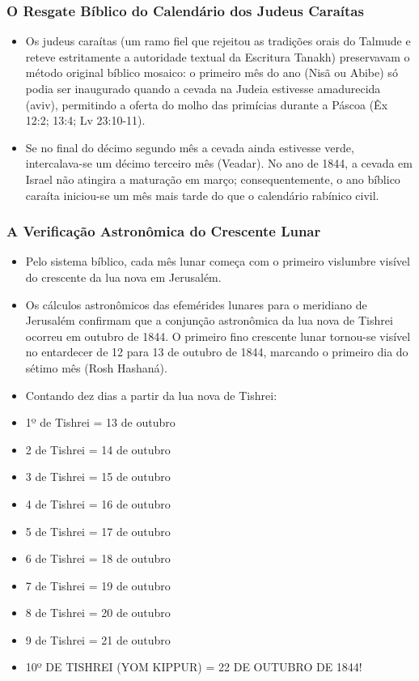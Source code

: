 \documentclass[11pt,a4paper,openany]{book}
\begin{document}
\subsubsection*{O Resgate Bíblico do Calendário dos Judeus Caraítas}
\begin{itemize}
  \item Os judeus caraítas (um ramo fiel que rejeitou as tradições orais do Talmude e reteve estritamente a autoridade textual da Escritura Tanakh) preservavam o método original bíblico mosaico: o primeiro mês do ano (Nisã ou Abibe) só podia ser inaugurado quando a cevada na Judeia estivesse amadurecida (aviv), permitindo a oferta do molho das primícias durante a Páscoa (Êx 12:2; 13:4; Lv 23:10-11).
  \item Se no final do décimo segundo mês a cevada ainda estivesse verde, intercalava-se um décimo terceiro mês (Veadar). No ano de 1844, a cevada em Israel não atingira a maturação em março; consequentemente, o ano bíblico caraíta iniciou-se um mês mais tarde do que o calendário rabínico civil.
\end{itemize}


\subsubsection*{A Verificação Astronômica do Crescente Lunar}
\begin{itemize}
  \item Pelo sistema bíblico, cada mês lunar começa com o primeiro vislumbre visível do crescente da lua nova em Jerusalém.
  \item Os cálculos astronômicos das efemérides lunares para o meridiano de Jerusalém confirmam que a conjunção astronômica da lua nova de Tishrei ocorreu em outubro de 1844. O primeiro fino crescente lunar tornou-se visível no entardecer de 12 para 13 de outubro de 1844, marcando o primeiro dia do sétimo mês (Rosh Hashaná).
  \item Contando dez dias a partir da lua nova de Tishrei:
  \item 1º de Tishrei = 13 de outubro
  \item 2 de Tishrei = 14 de outubro
  \item 3 de Tishrei = 15 de outubro
  \item 4 de Tishrei = 16 de outubro
  \item 5 de Tishrei = 17 de outubro
  \item 6 de Tishrei = 18 de outubro
  \item 7 de Tishrei = 19 de outubro
  \item 8 de Tishrei = 20 de outubro
  \item 9 de Tishrei = 21 de outubro
  \item 10º DE TISHREI (YOM KIPPUR) = 22 DE OUTUBRO DE 1844!
\end{itemize}
\end{document}
